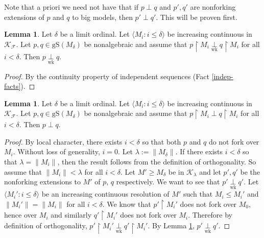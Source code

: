 \documentclass[12pt]{amsart}
\theoremstyle{definition}
\newtheorem{lem}[mydef]{Lemma}
\begin{document}
Note that a priori we need not have that if $p \perp q$ and $p', q'$ are nonforking extensions of $p$ and $q$ to big models, then $p' \perp q'$. This will be proven first.

\begin{lem}\label{wkperp-cont}
  Let $\delta$ be a limit ordinal. Let ${\langle {M_i : i \le \delta} \rangle}$ be increasing continuous in ${\mathcal{K}}_{\mathcal{F}}$. Let $p, q \in {\text{gS}} (M_\delta)$ be nonalgebraic and assume that $p {\upharpoonright} M_i {{{{\underset{{{\text{wk}}}}{\overset{{{{}}}}{{\perp}}}}}}} q {\upharpoonright} M_i$ for all $i < \delta$. Then $p {{{{\underset{{{\text{wk}}}}{\overset{{{{}}}}{{\perp}}}}}}} q$.
\end{lem}
\begin{proof}
  By the continuity property of independent sequences (Fact \ref{indep-facts}).
\end{proof}

\begin{lem}\label{perp-cont}
  Let $\delta$ be a limit ordinal. Let ${\langle {M_i : i \le \delta} \rangle}$ be increasing continuous in ${\mathcal{K}}_{\mathcal{F}}$. Let $p, q \in {\text{gS}} (M_\delta)$ be nonalgebraic and assume that $p {\upharpoonright} M_i \perp q {\upharpoonright} M_i$ for all $i < \delta$. Then $p \perp q$.
\end{lem}
\begin{proof}
  By local character, there exists $i < \delta$ so that both $p$ and $q$ do not fork over $M_i$. Without loss of generality, $i = 0$. Let $\lambda := \|M_\delta\|$. If there exists $i < \delta$ so that $\lambda = \|M_i\|$, then the result follows from the definition of orthogonality. So assume that $\|M_i\| < \lambda$ for all $i < \delta$. Let $M' {\ge} M_\delta$ be in ${\mathcal{K}}_\lambda$ and let $p', q'$ be the nonforking extensions to $M'$ of $p$, $q$ respectively. We want to see that $p' {{{{\underset{{{\text{wk}}}}{\overset{{{{}}}}{{\perp}}}}}}} q'$. Let ${\langle {M_i' : i \le \delta} \rangle}$ be an increasing continuous resolution of $M'$ such that $M_i {\le} M_i'$ and $\|M_i'\| = \|M_i\|$ for all $i < \delta$. We know that $p' {\upharpoonright} M_i'$ does not fork over $M_0$, hence over $M_i$ and similarly $q' {\upharpoonright} M_i'$ does not fork over $M_i$. Therefore by definition of orthogonality, $p' {\upharpoonright} M_i' {{{{\underset{{{\text{wk}}}}{\overset{{{{}}}}{{\perp}}}}}}} q' {\upharpoonright} M_i'$. By Lemma \ref{wkperp-cont}, $p' {{{{\underset{{{\text{wk}}}}{\overset{{{{}}}}{{\perp}}}}}}} q'$.
\end{proof}
\end{document}
